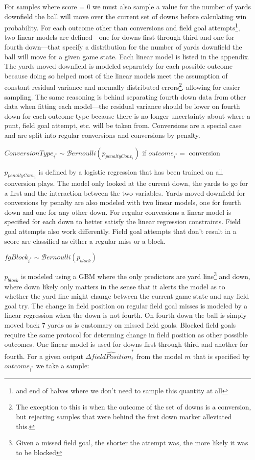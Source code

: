 \documentclass[12pt,twoside]{dukestatscithesis}
\begin{document}
For samples where score = 0 we must also sample a value for the number of yards downfield the ball will move over the current set of downs before calculating win probability. For each outcome other than conversions and field goal attempts\footnote{and end of halves where we don't need to sample this quantity at all}, two linear models are defined---one for downs first through third and one for fourth down---that specify a distribution for the number of yards downfield the ball will move for a given game state. Each linear model is listed in the appendix. The yards moved downfield is modeled separately for each possible outcome because doing so helped most of the linear models meet the assumption of constant residual variance and normally distributed errors\footnote{The exception to this is when the outcome of the set of downs is a conversion, but rejecting samples that were behind the first down marker alleviated this.}, allowing for easier sampling. The same reasoning is behind separating fourth down data from other data when fitting each model---the residual variance should be lower on fourth down for each outcome type because there is no longer uncertainty about where a punt, field goal attempt, etc. will be taken from. Conversions are a special case and are split into regular conversions and conversions by penalty.

\(ConversionType_{i^*} \sim \mathcal Bernoulli(p_{penaltyConv_i})\) if \(outcome_{i^*} =\) conversion

\(p_{penaltyConv_i}\) is defined by a logistic regression that has been trained on all conversion plays. The model only looked at the current down, the yards to go for a first and the interaction between the two variables. Yards moved downfield for conversions by penalty are also modeled with two linear models, one for fourth down and one for any other down. For regular conversions a linear model is specified for each down to better satisfy the linear regression constraints. Field goal attempts also work differently. Field goal attempts that don't result in a score are classified as either a regular miss or a block.

\(fgBlock_{i^*} \sim \mathcal Bernoulli(p_{block})\)

\(p_{block}\) is modeled using a GBM where the only predictors are yard line\footnote{Given a missed field goal, the shorter the attempt was, the more likely it was to be blocked} and down, where down likely only matters in the sense that it alerts the model as to whether the yard line might change between the current game state and any field goal try. The change in field position on regular field goal misses is modeled by a linear regression when the down is not fourth. On fourth down the ball is simply moved back 7 yards as is customary on missed field goals. Blocked field goals require the same protocol for determing change in field position as other possible outcomes. One linear model is used for downs first through third and another for fourth. For a given output \(\Delta\hat{fieldPosition}_i^*\) from the model \(m\) that is specified by \(outcome_{i^*}\) we take a sample:
\end{document}
